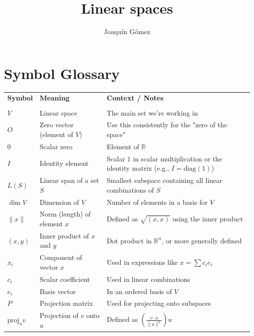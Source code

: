 \documentclass{book}
\title{Linear spaces}
\author{Joaquín Gómez}
\begin{document}
\frontmatter
\maketitle
\tableofcontents

\pagebreak
\section*{Symbol Glossary}
\begin{tabular}{@{}llp{8.5cm}@{}}
    \textbf{Symbol}     & \textbf{Meaning}             & \textbf{Context / Notes}                                                                \\
    \\[-0.8em] %
    $V$                 & Linear space                 & The main set we're working in                                                           \\
    $O$                 & Zero vector (element of $V$) & Use this consistently for the "zero of the space"                                       \\
    $0$                 & Scalar zero                  & Element of $\mathbb{R}$                                                                 \\
    $I$                 & Identity element             & Scalar $1$ in scalar multiplication or the identity matrix (e.g., $I = \text{diag}(1)$) \\
    $L(S)$              & Linear span of a set $S$     & Smallest subspace containing all linear combinations of $S$                             \\
    $\dim V$            & Dimension of $V$             & Number of elements in a basis for $V$                                                   \\
    $\|x\|$             & Norm (length) of element $x$ & Defined as $\sqrt{(x, x)}$ using the inner product                                      \\
    $(x, y)$            & Inner product of $x$ and $y$ & Dot product in $\mathbb{R}^n$, or more generally defined                                \\
    $x_i$               & Component of vector $x$      & Used in expressions like $x = \sum c_i e_i$                                             \\
    $c_i$               & Scalar coefficient           & Used in linear combinations                                                             \\
    $e_i$               & Basis vector                 & In an ordered basis of $V$                                                              \\
    $P$                 & Projection matrix            & Used for projecting onto subspaces                                                      \\
    $\mathrm{proj}_u v$ & Projection of $v$ onto $u$   & Defined as $\left(\frac{v \cdot u}{\|u\|^2}\right) u$                                   \\
\end{tabular}
\end{document}
